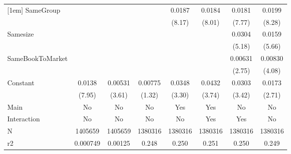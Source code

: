 {\begin{tabular}{l*{7}{c}}
[1em]
SameGroup           &                     &                     &                     &      0.0187\sym{***}&      0.0184\sym{***}&      0.0181\sym{***}&      0.0199\sym{***}\\
                    &                     &                     &                     &      (8.17)         &      (8.01)         &      (7.77)         &      (8.28)         \\
[1em]
Samesize            &                     &                     &                     &                     &                     &      0.0304\sym{***}&      0.0159\sym{***}\\
                    &                     &                     &                     &                     &                     &      (5.18)         &      (5.66)         \\
[1em]
SameBookToMarket    &                     &                     &                     &                     &                     &     0.00631\sym{**} &     0.00830\sym{***}\\
                    &                     &                     &                     &                     &                     &      (2.75)         &      (4.08)         \\
[1em]
Constant            &      0.0138\sym{***}&     0.00531\sym{***}&     0.00775         &      0.0348\sym{**} &      0.0432\sym{***}&      0.0303\sym{***}&      0.0173\sym{**} \\
                    &      (7.95)         &      (3.61)         &      (1.32)         &      (3.30)         &      (3.74)         &      (3.42)         &      (2.71)         \\
\hline
Main                &          No         &          No         &          No         &         Yes         &         Yes         &          No         &          No         \\
Interaction         &          No         &          No         &          No         &          No         &         Yes         &         Yes         &          No         \\
N                   &     1405659         &     1405659         &     1380316         &     1380316         &     1380316         &     1380316         &     1380316         \\
r2                  &    0.000749         &     0.00125         &       0.248         &       0.250         &       0.251         &       0.250         &       0.249         \\

\end{tabular}}

